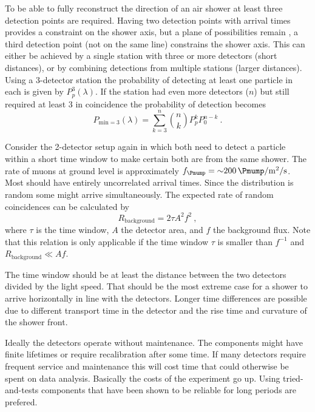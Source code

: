 To be able to fully reconstruct the direction of an air shower at least three detection points are required. Having two detection points with arrival times provides a constraint on the shower axis, but a plane of possibilities remain \cite{schultheiss2016pair}, a third detection point (not on the same line) constrains the shower axis. This can either be achieved by a single station with three or more detectors (short distances), or by combining detections from multiple stations (larger distances). Using a 3-detector station the probability of detecting at least one particle in each is given by $P_p^3(\lambda)$. If the station had even more detectors ($n$) but still required at least 3 in coincidence the probability of detection becomes
%
\begin{equation}
    P_{\mathrm{min}=3}(\lambda) = \sum_{k=3}^{n} \binom{n}{k} P_p^k P_0^{n-k} \ .
\end{equation}

Consider the 2-detector setup again in which both need to detect a particle within a short time window to make certain both are from the same shower. The rate of muons at ground level is approximately $f_{\Pmump} = \SI{~200}{\Pmump\per\meter\squared\per\second}$. Most should have entirely uncorrelated arrival times. Since the distribution is random some might arrive simultaneously. The expected rate of random coincidences can be calculated by
%
\begin{equation}
    \label{eq:background_rate}
    R_{\mathrm{background}} = 2 \tau A^2 f^2 \ ,
\end{equation}
%
where $\tau$ is the time window, $A$ the detector area, and $f$ the background flux. Note that this relation is only applicable if the time window $\tau$ is smaller than $f^{-1}$ and $R_{\mathrm{background}} \ll Af$.

The time window should be at least the distance between the two detectors divided by the light speed. That should be the most extreme case for a shower to arrive horizontally in line with the detectors. Longer time differences are possible due to different transport time in the detector and the rise time and curvature of the shower front.

Ideally the detectors operate without maintenance. The components might have finite lifetimes or require recalibration after some time. If many detectors require frequent service and maintenance this will cost time that could otherwise be spent on data analysis. Basically the costs of the experiment go up. Using tried-and-tests components that have been shown to be reliable for long periods are prefered.

